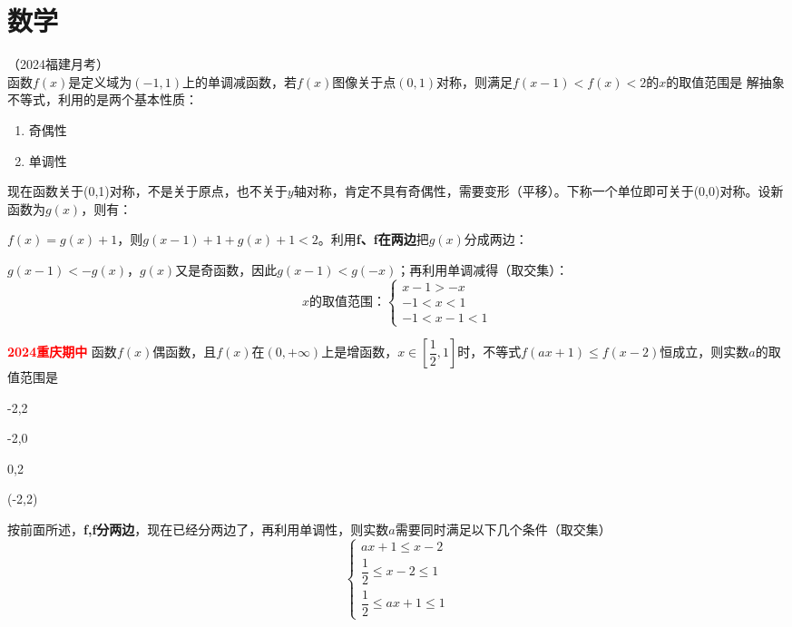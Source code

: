 \documentclass[CJKmath,a4paper,10pt]{ctexart}
\begin{document}
\section{数学}
%

\begin{liti}
（2024福建月考）$函数f(x)是定义域为(-1,1)上的单调减函数，若f(x)图像关于点(0,1)对称，则满足f(x-1)<f(x)<2的x的取值范围是$
\tcblower\small\kaishu
解抽象不等式，利用的是两个基本性质：
\begin{enumerate}
\item 奇偶性
\item 单调性
\end{enumerate}
现在函数关于(0,1)对称，不是关于原点，也不关于$y$轴对称，肯定不具有奇偶性，需要变形（平移）。下称一个单位即可关于(0,0)对称。设新函数为$g(x)$，则有：

$f(x)=g(x)+1$，则$g(x-1)+1+g(x)+1<2$。利用\textbf{f、f在两边}把$g(x)$分成两边：

$g(x-1)<-g(x)$，$g(x)$又是奇函数，因此$g(x-1)<g(-x)$；再利用单调减得（取交集）：
\[
x的取值范围：
\begin{cases}
x-1>-x\\
-1<x<1\\
-1<x-1<1
\end{cases}
\]

\end{liti}


\begin{liti}
\textcolor{red}{\bfseries 2024重庆期中} 函数$f(x)$偶函数，且$f(x)$在$(0,+\infty)$上是增函数，$x\in[\dfrac{1}{2},1]$时，不等式$f(ax+1)\leq f(x-2)$恒成立，则实数$a$的取值范围是
\begin{choices}
\item [-2,2]
\item [-2,0]
\item [0,2]
\item (-2,2)
\end{choices}
\tcblower\kaishu\small
按前面所述，\textbf{f,f分两边}，现在已经分两边了，再利用单调性，则实数$a$需要同时满足以下几个条件（取交集）
\[\begin{cases}
ax+1\leq x-2\\
\dfrac{1}{2}\leq x-2 \leq 1\\
\dfrac{1}{2}\leq ax+1 \leq 1
\end{cases}\]

\end{liti}
\end{document}
